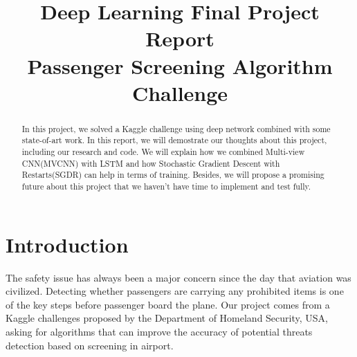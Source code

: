 \documentclass[conference,compsoc]{IEEEtran}
\begin{document}
\title{
	Deep Learning Final Project Report \\
	Passenger Screening Algorithm Challenge \\
}


\author{
\and
}

\maketitle

\begin{abstract}
In this project, we solved a Kaggle challenge using deep network combined with some state-of-art work. In this report, we will demostrate our thoughts about this project, including our research and code. We will explain how we combined Multi-view CNN(MVCNN) with LSTM and how Stochastic Gradient Descent with Restarts(SGDR) can help in terms of training. Besides, we will propose a promising future about this project that we haven't have time to implement and test fully.
\end{abstract}

\section{Introduction}

The safety issue has always been a major concern since the day that aviation was civilized. Detecting whether passengers are carrying any prohibited items is one of the key steps before passenger board the plane. Our project comes from a Kaggle challenges proposed by the Department of Homeland Security, USA, asking for algorithms that can improve the accuracy of potential threats detection based on screening in airport.
\end{document}
